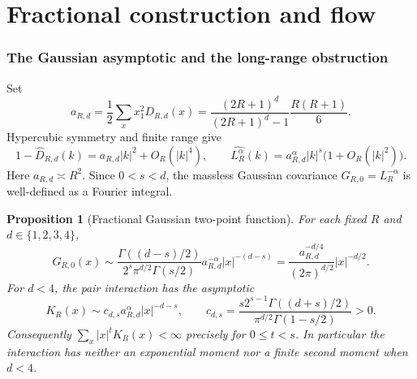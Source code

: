 \documentclass[11pt]{article}
\newtheorem{proposition}{Proposition}[section]
\begin{document}
\clearpage
\part{Fractional construction and flow}\label{part:fractional}

\section{The Gaussian asymptotic and the long-range obstruction}
\label{frac:gaussian}

Set
\[
 a_{R,d}=\frac12\sum_x x_1^2D_{R,d}(x)
 =\frac{(2R+1)^d}{(2R+1)^d-1}\frac{R(R+1)}6.
\]
Hypercubic symmetry and finite range give
\begin{equation}\label{frac:symbol}
 1-\widehat D_{R,d}(k)=a_{R,d}|k|^2+O_R(|k|^4),\qquad
 \widehat{L_R^\alpha}(k)
   =a_{R,d}^{\alpha}|k|^s
           \bigl(1+O_R(|k|^2)\bigr).
\end{equation}
Here \(a_{R,d}\asymp R^2\). Since \(0<s<d\), the massless
Gaussian covariance \(G_{R,0}=L_R^{-\alpha}\) is well-defined
as a Fourier integral.

\begin{proposition}[Fractional Gaussian two-point function]
\label{frac:green-prop}
For each fixed \(R\) and \(d\in\{1,2,3,4\}\),
\begin{equation}\label{frac:green}
 G_{R,0}(x)\sim
 \frac{\Gamma((d-s)/2)}{2^s\pi^{d/2}\Gamma(s/2)}
 a_{R,d}^{-\alpha}|x|^{-(d-s)}
 =\frac{a_{R,d}^{-d/4}}{(2\pi)^{d/2}}|x|^{-d/2}.
\end{equation}
For \(d<4\), the pair interaction has the asymptotic
\begin{equation}\label{frac:tail}
 K_R(x)\sim c_{d,s}a_{R,d}^{\alpha}|x|^{-d-s},\qquad
 c_{d,s}=\frac{s2^{s-1}\Gamma((d+s)/2)}
                    {\pi^{d/2}\Gamma(1-s/2)}>0.
\end{equation}
Consequently \(\sum_x|x|^tK_R(x)<\infty\) precisely for
\(0\le t<s\). In particular the interaction has neither an
exponential moment nor a finite second moment when \(d<4\).
\end{proposition}
\end{document}
